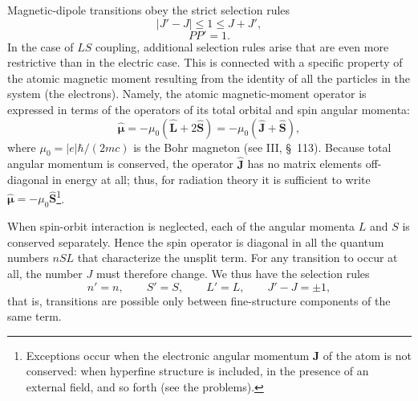 Magnetic-dipole transitions obey the strict selection rules
\begin{equation}
|J'-J|\leq1\leq J+J',
\tag{50.2}
\end{equation}
\begin{equation}
PP'=1.
\tag{50.3}
\end{equation}
In the case of $LS$ coupling, additional selection rules arise that are even more restrictive than in the electric case. This is connected with a specific property of the atomic magnetic moment resulting from the identity of all the particles in the system (the electrons). Namely, the atomic magnetic-moment operator is expressed in terms of the operators of its total orbital and spin angular momenta:
\begin{equation}
\widehat{\boldsymbol\mu}=-\mu_0(\widehat{\mathbf L}+2\widehat{\mathbf S})
=-\mu_0(\widehat{\mathbf J}+\widehat{\mathbf S}),
\tag{50.4}
\end{equation}
where $\mu_0=|e|\hbar/(2mc)$ is the Bohr magneton (see III, \S~113). Because total angular momentum is conserved, the operator $\widehat{\mathbf J}$ has no matrix elements off-diagonal in energy at all; thus, for radiation theory it is sufficient to write $\widehat{\boldsymbol\mu}=-\mu_0\widehat{\mathbf S}$\footnote{Exceptions occur when the electronic angular momentum $\mathbf J$ of the atom is not conserved: when hyperfine structure is included, in the presence of an external field, and so forth (see the problems).}.

When spin-orbit interaction is neglected, each of the angular momenta $L$ and $S$ is conserved separately. Hence the
spin operator is diagonal in all the quantum numbers $nSL$ that characterize the unsplit term. For any transition to occur at all, the number $J$ must therefore change. We thus have the selection rules
\begin{equation}
n'=n,\qquad S'=S,\qquad L'=L,\qquad J'-J=\pm1,
\tag{50.5}
\end{equation}
that is, transitions are possible only between fine-structure components of the same term.

